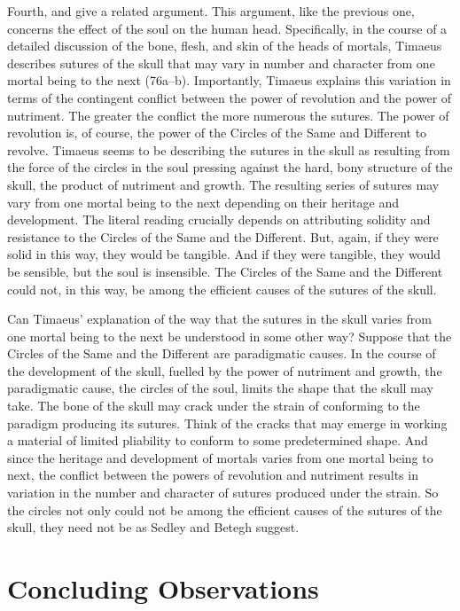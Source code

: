 Fourth, \citet[330]{Sedley:1997kr} and \citet[132]{Betegh:2019fq} give a related argument. This argument, like the previous one, concerns the effect of the soul on the human head. Specifically, in the course of a detailed discussion of the bone, flesh, and skin of the heads of mortals, Timaeus describes sutures of the skull that may vary in number and character from one mortal being to the next (76a--b). Importantly, Timaeus explains this variation in terms of the contingent conflict between the power of revolution and the power of nutriment. The greater the conflict the more numerous the sutures. The power of revolution is, of course, the power of the Circles of the Same and Different to revolve. Timaeus seems to be describing the sutures in the skull as resulting from the force of the circles in the soul pressing against the hard, bony structure of the skull, the product of nutriment and growth. The resulting series of sutures may vary from one mortal being to the next depending on their heritage and development. The literal reading crucially depends on attributing solidity and resistance to the Circles of the Same and the Different. But, again, if they were solid in this way, they would be tangible. And if they were tangible, they would be sensible, but the soul is insensible. The Circles of the Same and the Different could not, in this way, be among the efficient causes of the sutures of the skull.

Can Timaeus' explanation of the way that the sutures in the skull varies from one mortal being to the next be understood in some other way? Suppose that the Circles of the Same and the Different are paradigmatic causes. In the course of the development of the skull, fuelled by the power of nutriment and growth, the paradigmatic cause, the circles of the soul, limits the shape that the skull may take. The bone of the skull may crack under the strain of conforming to the paradigm producing its sutures. Think of the cracks that may emerge in working a material of limited pliability to conform to some predetermined shape. And since the heritage and development of mortals varies from one mortal being to next, the conflict between the powers of revolution and nutriment results in variation in the number and character of sutures produced under the strain. So the circles not only could not be among the efficient causes of the sutures of the skull, they need not be as Sedley and Betegh suggest.



\section{Concluding Observations} %
\label{sec:concluding_observations_p}




